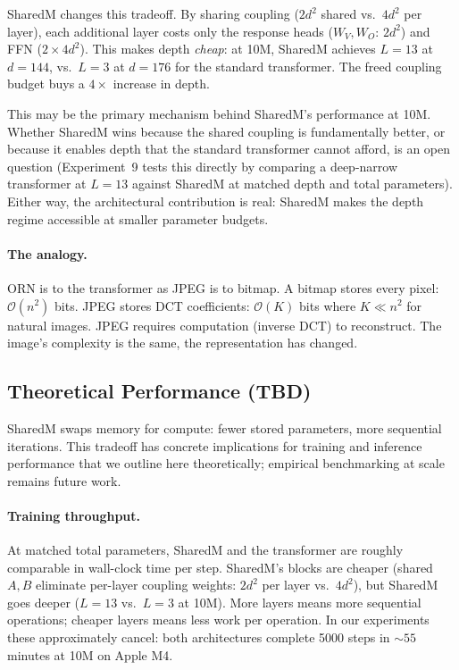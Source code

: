 \documentclass[11pt, a4paper]{article}
\newcommand{\bigO}{\mathcal{O}}
\theoremstyle{remark}
\begin{document}
SharedM changes this tradeoff.
By sharing coupling ($2d^2$ shared vs.\ $4d^2$ per layer), each additional layer costs only the response heads ($W_V, W_O$: $2d^2$) and FFN ($2 \times 4d^2$).
This makes depth \emph{cheap}: at 10M, SharedM achieves $L = 13$ at $d = 144$, vs.\ $L = 3$ at $d = 176$ for the standard transformer.
The freed coupling budget buys a $4\times$ increase in depth.

This may be the primary mechanism behind SharedM's performance at 10M.
Whether SharedM wins because the shared coupling is fundamentally better, or because it enables depth that the standard transformer cannot afford, is an open question (Experiment~9 tests this directly by comparing a deep-narrow transformer at $L = 13$ against SharedM at matched depth and total parameters).
Either way, the architectural contribution is real: SharedM makes the depth regime accessible at smaller parameter budgets.

\paragraph{The analogy.}
ORN is to the transformer as JPEG is to bitmap.
A bitmap stores every pixel: $\bigO(n^2)$ bits.
JPEG stores DCT coefficients: $\bigO(K)$ bits where $K \ll n^2$ for natural images.
JPEG requires computation (inverse DCT) to reconstruct.
The image's complexity is the same, the representation has changed.

\subsection{Theoretical Performance (TBD)}

SharedM swaps memory for compute: fewer stored parameters, more sequential iterations.
This tradeoff has concrete implications for training and inference performance that we outline here theoretically; empirical benchmarking at scale remains future work.

\paragraph{Training throughput.}
At matched total parameters, SharedM and the transformer are roughly comparable in wall-clock time per step.
SharedM's blocks are cheaper (shared $A, B$ eliminate per-layer coupling weights: $2d^2$ per layer vs.\ $4d^2$), but SharedM goes deeper ($L = 13$ vs.\ $L = 3$ at 10M).
More layers means more sequential operations; cheaper layers means less work per operation.
In our experiments these approximately cancel: both architectures complete 5000 steps in ${\sim}55$ minutes at 10M on Apple M4.
\end{document}
